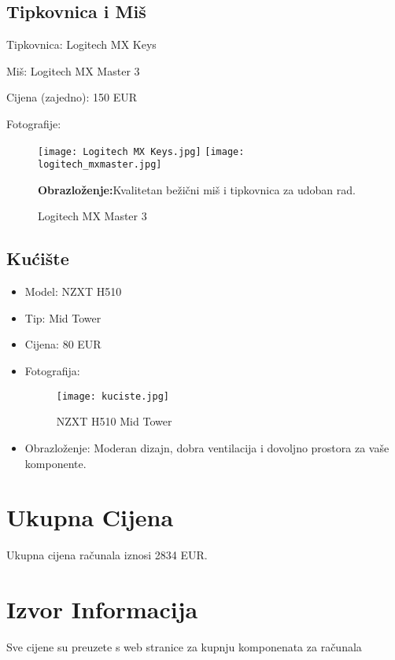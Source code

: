 \documentclass[30pt, letterpaper,utf8,a4paper]{article}
\begin{document}
\subsection{Tipkovnica i Miš}
\begin{itemize}
\item Tipkovnica: Logitech MX Keys
\item Miš: Logitech MX Master 3
 \item Cijena (zajedno): 150 EUR
 \item Fotografije: 
 \begin{figure}[H]
\centering  
\texttt{[image: Logitech MX Keys.jpg]}
  \hfill
\texttt{[image: logitech\_mxmaster.jpg]}
\caption{Logitech MX Master 3}
\item \textbf{Obrazloženje:}Kvalitetan bežični miš i tipkovnica za udoban rad.
\end{figure}
\end{itemize}



\subsection{Kućište}
\begin{itemize}
    \item Model: NZXT H510
    \item Tip: Mid Tower
    \item Cijena: 80 EUR
    \item Fotografija: \begin{figure}[H]
        \centering
        \texttt{[image: kuciste.jpg]}
        \caption{NZXT H510 Mid Tower}
    \end{figure}
    \item Obrazloženje: Moderan dizajn, dobra ventilacija i dovoljno prostora za vaše komponente.
\end{itemize}



\newpage

\section{Ukupna Cijena}
Ukupna cijena računala iznosi 2834 EUR.

\section{Izvor Informacija}
Sve cijene su preuzete s web stranice za kupnju komponenata za računala
\end{document}
